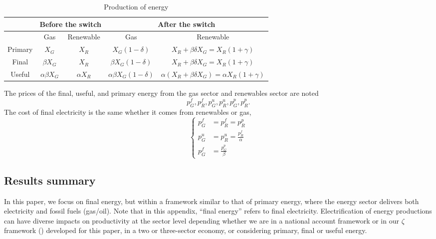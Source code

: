 \documentclass[11pt]{article}
\begin{document}
\begin{table}[H]
\centering
\begin{tabular}{@{}c|cc|cc@{}}
\toprule
        & \multicolumn{2}{c|}{Before the switch} & \multicolumn{2}{c}{After the switch} \\ \midrule
        & Gas             & Renewable            & Gas            & Renewable           \\ \midrule
Primary &     $X_G$   &    $X_R$    &  $X_G(1-\delta)$  & $X_R+\beta\delta X_G=X_R(1+\gamma)$               \\
Final   &      $\beta X_G$              &  $X_R$                      &          $\beta X_G (1-\delta)$        &        $X_R+\beta\delta X_G=X_R(1+\gamma)$               \\
Useful&  $\alpha\beta X_G$              & $\alpha X_R$                      &          $\alpha\beta X_G (1-\delta)$        &        $\alpha(X_R+\beta\delta X_G)=\alpha X_R(1+\gamma)$                   \\ \bottomrule
\end{tabular}
\caption{Production of energy}
\label{tab_summary_energy_prod}
\end{table}


The prices of the final, useful, and primary energy from the gas sector and renewables sector are noted
\[p_G^f, p_R^f,p_G^u, p_R^u,p_G^p, p_R^p. \]
The cost of final electricity is the same whether it comes from renewables or gas, 
\begin{equation}
\label{eq:price_elec}
\begin{cases}
     p_G^f&=p_R^f=p_R^p\\
      p_G^u&=p_R^u=\frac{p_R^f}{\alpha}\\
    p_G^f&=\frac{p_G^p}{\beta}
\end{cases}
\end{equation}


\subsection{Results summary}

In this paper, we focus on final energy, but within a framework similar to that of primary energy, where the energy sector delivers both electricity and fossil fuels (gas/oil). Note that in this appendix, ``final energy'' refers to final electricity. Electrification of energy productions can have diverse impacts on productivity at the sector level depending whether we are in a national account framework or in our $\zeta$ framework () developed for this paper, in a two or three-sector economy, or considering primary, final or useful energy.
\end{document}
